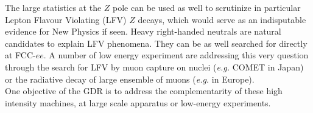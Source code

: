 The large statistics at the $Z$ pole can be used as well to scrutinize in particular Lepton Flavour Violating (LFV) $Z$ decays, which would serve as an indisputable evidence for New Physics if seen. Heavy right-handed neutrals are natural candidates to explain LFV phenomena. They can be as well searched for directly at FCC-$ee$. A number of low energy experiment are addressing this very question through the search for LFV by muon capture on nuclei ({\it e.g.} COMET in Japan) or the radiative decay of large ensemble of muons ({\it e.g.} in Europe). \\

One objective of the GDR is to address the complementarity of these high intensity machines,  at large scale apparatus or low-energy experiments.       


